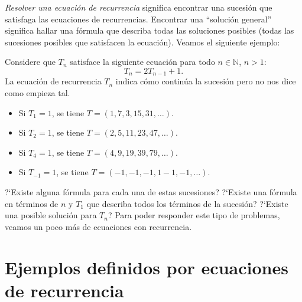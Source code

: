 \textit{Resolver una ecuación de recurrencia} significa encontrar una sucesión que satisfaga las ecuaciones de recurrencias. Encontrar una ``solución general'' significa hallar una fórmula que describa todas las soluciones posibles (todas las sucesiones posibles que satisfacen la ecuación). Veamos el siguiente ejemplo:

\begin{example}
	Considere que $T_{n}$ satisface la siguiente ecuación para todo $n\in\mathds{N}$, $n>1$:
	\begin{equation*}
	T_{n}=2T_{n-1}+1.
	\end{equation*}
	La ecuación de recurrencia $T_{n}$ indica cómo continúa la sucesión pero no nos dice como empieza tal. %
	\begin{itemize}
		\item Si $T_{1}=1$, se tiene $T=\left(1,7,3,15,31,\ldots\right)$.
		\item Si $T_{2}=1$, se tiene $T=\left(2,5,11,23,47,\ldots\right)$.
		\item Si $T_{4}=1$, se tiene $T=\left(4,9,19,39,79,\ldots\right)$.
		\item Si $T_{-1}=1$, se tiene $T=\left(-1,-1,-1,1-1,-1,\ldots\right)$.
	\end{itemize}
	?`Existe alguna fórmula para cada una de estas sucesiones? ?`Existe una fórmula en términos de $n$ y $T_{1}$ que describa todos los términos de la sucesión? ?`Existe una posible solución para $T_{n}$? Para poder responder este tipo de problemas, veamos un poco más de ecuaciones con recurrencia.
\end{example}

\section{Ejemplos definidos por ecuaciones de recurrencia}

